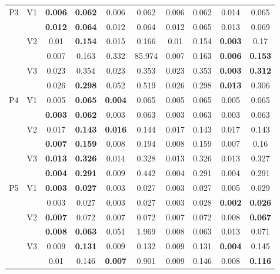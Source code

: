 \documentclass[12pt,a4paper]{article}
\begin{document}
\begin{sidewaystable}[ht]
{\begin{tabular}{cc|cc|cc|cc|cc|}
   \hline \hline\multirow{6}{*}{P3} & \multirow{2}{*}{V1} & \textbf{0.006} & \textbf{0.062} & 0.006 & 0.062 & 0.006 & 0.062 & 0.014 & 0.065 \\ 
   &  & \textbf{0.012} & \textbf{0.064} & 0.012 & 0.064 & 0.012 & 0.065 & 0.013 & 0.069 \\ 
   & \multirow{2}{*}{V2} & 0.01 & \textbf{0.154} & 0.015 & 0.166 & 0.01 & 0.154 & \textbf{0.003} & 0.17 \\ 
   &  & 0.007 & 0.163 & 0.332 & 85.974 & 0.007 & 0.163 & \textbf{0.006} & \textbf{0.153} \\ 
   & \multirow{2}{*}{V3} & 0.023 & 0.354 & 0.023 & 0.353 & 0.023 & 0.353 & \textbf{0.003} & \textbf{0.312} \\ 
   &  & 0.026 & \textbf{0.298} & 0.052 & 0.519 & 0.026 & 0.298 & \textbf{0.013} & 0.306 \\ 
   \hline \hline\multirow{6}{*}{P4} & \multirow{2}{*}{V1} & 0.005 & \textbf{0.065} & \textbf{0.004} & 0.065 & 0.005 & 0.065 & 0.005 & 0.065 \\ 
   &  & \textbf{0.003} & \textbf{0.062} & 0.003 & 0.063 & 0.003 & 0.063 & 0.003 & 0.063 \\ 
   & \multirow{2}{*}{V2} & 0.017 & \textbf{0.143} & \textbf{0.016} & 0.144 & 0.017 & 0.143 & 0.017 & 0.143 \\ 
   &  & \textbf{0.007} & \textbf{0.159} & 0.008 & 0.194 & 0.008 & 0.159 & 0.007 & 0.16 \\ 
   & \multirow{2}{*}{V3} & \textbf{0.013} & \textbf{0.326} & 0.014 & 0.328 & 0.013 & 0.326 & 0.013 & 0.327 \\ 
   &  & \textbf{0.004} & \textbf{0.291} & 0.009 & 0.442 & 0.004 & 0.291 & 0.004 & 0.291 \\ 
   \hline \hline\multirow{6}{*}{P5} & \multirow{2}{*}{V1} & \textbf{0.003} & \textbf{0.027} & 0.003 & 0.027 & 0.003 & 0.027 & 0.005 & 0.029 \\ 
   &  & 0.003 & 0.027 & 0.003 & 0.027 & 0.003 & 0.028 & \textbf{0.002} & \textbf{0.026} \\ 
   & \multirow{2}{*}{V2} & \textbf{0.007} & 0.072 & 0.007 & 0.072 & 0.007 & 0.072 & 0.008 & \textbf{0.067} \\ 
   &  & \textbf{0.008} & \textbf{0.063} & 0.051 & 1.969 & 0.008 & 0.063 & 0.013 & 0.071 \\ 
   & \multirow{2}{*}{V3} & 0.009 & \textbf{0.131} & 0.009 & 0.132 & 0.009 & 0.131 & \textbf{0.004} & 0.145 \\ 
   &  & 0.01 & 0.146 & \textbf{0.007} & 0.901 & 0.009 & 0.146 & 0.008 & \textbf{0.116} \\ 

\end{tabular}}
\end{sidewaystable}
\end{document}
